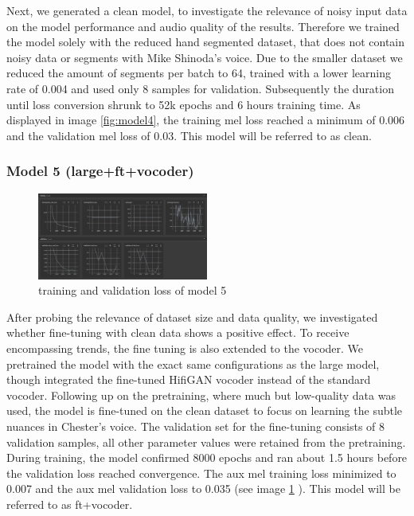 \documentclass[a4paper]{article}
\begin{document}
	Next, we generated a clean model, to investigate the relevance of noisy input data on the model performance and audio quality of the results. Therefore we trained the model solely with the reduced hand segmented dataset, that does not contain noisy data or segments with Mike Shinoda’s voice. Due to the smaller dataset we reduced the amount of segments per batch to 64, trained with a lower learning rate of 0.004 and used only 8 samples for validation. Subsequently the duration until loss conversion shrunk to 52k epochs and 6 hours training time. As displayed in image \ref{fig:model4}, the training mel loss reached a minimum of 0.006 and the validation mel loss of 0.03. This model will be referred to as clean.
	
	
	\subsubsection{Model 5 (large+ft+vocoder)}
	
	\begin{figure}[htbp]
		\centering
		\includegraphics[width=0.5\textwidth]{graphics/v5_training+testing.png}
		\caption{training and validation loss of model 5}
		\label{fig:model5}
	\end{figure}
	
	After probing the relevance of dataset size and data quality, we investigated whether fine-tuning with clean data shows a positive effect. To receive encompassing trends, the fine tuning is also extended to the vocoder. We pretrained the model with the exact same configurations as the large model, though integrated the fine-tuned HifiGAN vocoder instead of the standard vocoder. Following up on the pretraining, where much but low-quality data was used, the model is fine-tuned on the clean dataset to focus on learning the subtle nuances in Chester’s voice. The validation set for the fine-tuning consists of 8 validation samples, all other parameter values were retained from the pretraining. During training, the model confirmed 8000 epochs and ran about 1.5 hours before the validation loss reached convergence. The aux mel training loss minimized to 0.007 and the aux mel validation loss to 0.035 (see image \ref{fig:model5} ). This model will be referred to as ft+vocoder.
\end{document}

